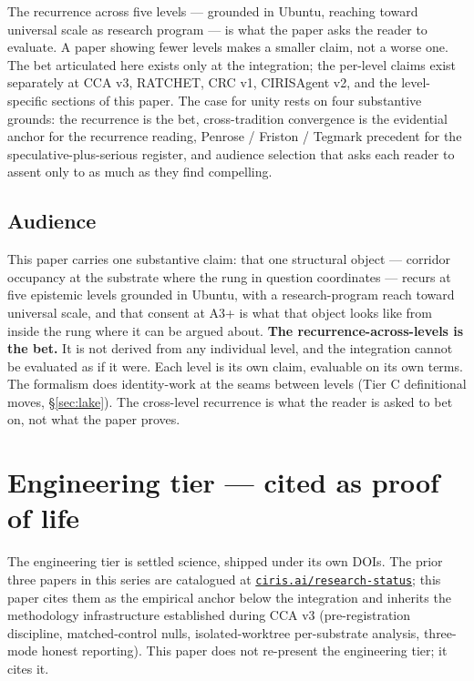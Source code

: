 \documentclass[11pt,a4paper]{article}
\begin{document}
The recurrence across five levels --- grounded in Ubuntu, reaching toward universal scale as research program --- is what the paper asks the reader to evaluate. A paper showing fewer levels makes a smaller claim, not a worse one. The bet articulated here exists only at the integration; the per-level claims exist separately at CCA v3, RATCHET, CRC v1, CIRISAgent v2, and the level-specific sections of this paper. The case for unity rests on four substantive grounds: the recurrence is the bet, cross-tradition convergence is the evidential anchor for the recurrence reading, Penrose / Friston / Tegmark precedent for the speculative-plus-serious register, and audience selection that asks each reader to assent only to as much as they find compelling.

\subsection*{Audience}

This paper carries one substantive claim: that one structural object --- corridor occupancy at the substrate where the rung in question coordinates --- recurs at five epistemic levels grounded in Ubuntu, with a research-program reach toward universal scale, and that consent at A3+ is what that object looks like from inside the rung where it can be argued about. \textbf{The recurrence-across-levels is the bet.} It is not derived from any individual level, and the integration cannot be evaluated as if it were. Each level is its own claim, evaluable on its own terms. The formalism does identity-work at the seams between levels (Tier C definitional moves, \S\ref{sec:lake}). The cross-level recurrence is what the reader is asked to bet on, not what the paper proves.

\section{Engineering tier --- cited as proof of life}\label{sec:engineering}

The engineering tier is settled science, shipped under its own DOIs. The prior three papers in this series are catalogued at \href{https://ciris.ai/research-status}{\texttt{ciris.ai/research-status}}; this paper cites them as the empirical anchor below the integration and inherits the methodology infrastructure established during CCA v3 (pre-registration discipline, matched-control nulls, isolated-worktree per-substrate analysis, three-mode honest reporting). This paper does not re-present the engineering tier; it cites it.
\end{document}
